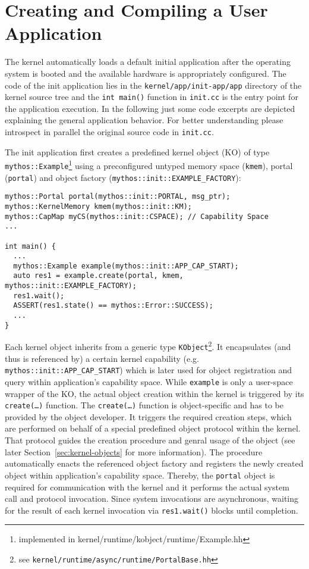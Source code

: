 \section{Creating and Compiling a User Application}
\label{sec:init-app}

The \mythos kernel automatically loads a default initial application after the
operating system is booted and the available hardware is appropriately
configured. The code of the init application lies in the
\texttt{kernel/app/init-app/app} directory of the kernel source tree and the
\texttt{int main()} function in \texttt{init.cc} is the entry point for the
application execution. In the following just some code excerpts are depicted
explaining the general application behavior. For better understanding please
introspect in parallel the original source code in \texttt{init.cc}.

The init application first creates a predefined kernel object (KO) of type
\texttt{mythos::Example}\footnote{implemented in
kernel/runtime/kobject/runtime/Example.hh} using a preconfigured untyped memory
space (\texttt{kmem}), portal (\texttt{portal}) and object factory
(\texttt{mythos::init::EXAMPLE\_FACTORY}):

\lstset{language=c++}
\begin{lstlisting}
mythos::Portal portal(mythos::init::PORTAL, msg_ptr);
mythos::KernelMemory kmem(mythos::init::KM);
mythos::CapMap myCS(mythos::init::CSPACE); // Capability Space
...

int main() {
  ...
  mythos::Example example(mythos::init::APP_CAP_START);
  auto res1 = example.create(portal, kmem, mythos::init::EXAMPLE_FACTORY);
  res1.wait();
  ASSERT(res1.state() == mythos::Error::SUCCESS);
  ...
}
\end{lstlisting}

\noindent Each kernel object inherits from a generic type
\texttt{KObject}\footnote{see
\texttt{kernel/runtime/async/runtime/PortalBase.hh}}.
It encapsulates (and thus is referenced by) a certain kernel capability (e.g.
\texttt{mythos::init::APP\_CAP\_START}) which is later used for object
registration and query within application's capability space. While
\texttt{example} is only a user-space wrapper of the KO, the actual object
creation within the kernel is triggered by its \texttt{create(\ldots)} function.
The \texttt{create(\ldots)} function is object-specific and has to be provided
by the object developer. It triggers the required creation steps, which are
performed on behalf of a special predefined object protocol within the kernel.
That protocol guides the creation procedure and genral usage of the object (see
later Section~\ref{sec:kernel-objects} for more information). The procedure
automatically enacts the referenced object factory and registers the newly
created object within application's capability space.
Thereby, the \texttt{portal} object is required for communication with the
kernel and it performs the actual system call and protocol invocation. Since
system invocations are asynchronous, waiting for the result of each kernel
invocation via \texttt{res1.wait()} blocks until completion.

